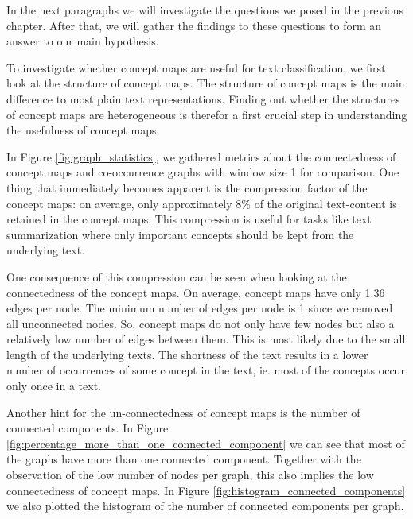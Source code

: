 In the next paragraphs we will investigate the questions we posed in the previous chapter.
After that, we will gather the findings to these questions to form an answer to our main hypothesis.


To investigate whether concept maps are useful for text classification, we first look at the structure of concept maps.
The structure of concept maps is the main difference to most plain text representations.
Finding out whether the structures of concept maps are heterogeneous is therefor a first crucial step in understanding the usefulness of concept maps.

In Figure \ref{fig:graph_statistics}, we gathered metrics about the connectedness of concept maps and co-occurrence graphs with window size 1 for comparison.
One thing that immediately becomes apparent is the compression factor of the concept maps: on average, only approximately 8\% of the original text-content is retained in the concept maps.
This compression is useful for tasks like text summarization where only important concepts should be kept from the underlying text.

One consequence of this compression can be seen when looking at the connectedness of the concept maps.
On average, concept maps have only 1.36 edges per node. The minimum number of edges per node is 1 since we removed all unconnected nodes.
So, concept maps do not only have few nodes but also a relatively low number of edges between them.
This is most likely due to the small length of the underlying texts.
The shortness of the text results in a lower number of occurrences of some concept in the text, ie. most of the concepts occur only once in a text.

Another hint for the un-connectedness of concept maps is the number of connected components.
In Figure \ref{fig:percentage_more_than_one_connected_component} we can see that most of the graphs have more than one connected component. Together with the observation of the low number of nodes per graph, this also implies the low connectedness of concept maps.
In Figure \ref{fig:histogram_connected_components} we also plotted the histogram of the number of connected components per graph.

